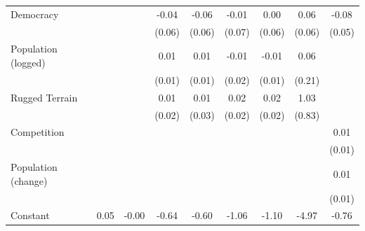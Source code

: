 \documentclass[12pt, letterpaper]{article}
\begin{document}
\begin{landscape}
\begin{table}[htbp]
\begin{footnotesize}
\begin{tabular}{l*{8}{c}}
Democracy           &                     &                     &       -0.04         &       -0.06         &       -0.01         &        0.00         &        0.06         &       -0.08\sym{+}  \\
                    &                     &                     &      (0.06)         &      (0.06)         &      (0.07)         &      (0.06)         &      (0.06)         &      (0.05)         \\
Population (logged) &                     &                     &        0.01         &        0.01         &       -0.01         &       -0.01         &        0.06         &                     \\
                    &                     &                     &      (0.01)         &      (0.01)         &      (0.02)         &      (0.01)         &      (0.21)         &                     \\
Rugged Terrain      &                     &                     &        0.01         &        0.01         &        0.02         &        0.02         &        1.03         &                     \\
                    &                     &                     &      (0.02)         &      (0.03)         &      (0.02)         &      (0.02)         &      (0.83)         &                     \\
Competition         &                     &                     &                     &                     &                     &                     &                     &        0.01         \\
                    &                     &                     &                     &                     &                     &                     &                     &      (0.01)         \\
Population (change) &                     &                     &                     &                     &                     &                     &                     &        0.01         \\
                    &                     &                     &                     &                     &                     &                     &                     &      (0.01)         \\
Constant            &        0.05\sym{**} &       -0.00         &       -0.64\sym{*}  &       -0.60\sym{+}  &       -1.06\sym{***}&       -1.10\sym{***}&       -4.97\sym{**} &       -0.76\sym{**} \\

\end{tabular}
\end{footnotesize}
\end{table}
\end{landscape}
\end{document}
